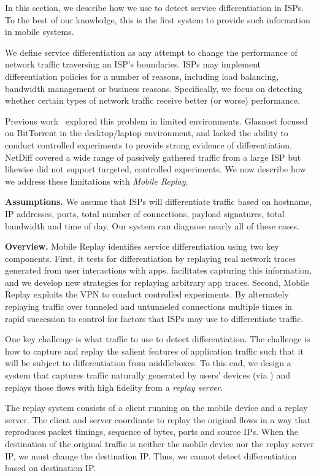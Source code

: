 In this section, we describe how we use \meddle to detect service differentiation 
in ISPs. To the best of our knowledge, this is the first system to provide such information 
in mobile systems.

We define service differentiation as any attempt to change the performance 
of network traffic traversing an ISP's boundaries. ISPs may implement differentiation policies 
for a number of reasons, including load balancing, bandwidth management or business reasons. 
Specifically, we focus on detecting whether certain types of network traffic receive 
better (or worse) performance. 

Previous work~\cite{glasnost,netdiff} explored this problem in limited 
environments. Glasnost focused on BitTorrent in the desktop/laptop environment, 
and lacked the ability to conduct controlled experiments to provide strong evidence 
of differentiation. NetDiff covered a wide range of passively gathered traffic from a 
large ISP but likewise did not support targeted, controlled experiments. We now 
describe how we address these limitations with \emph{Mobile Replay}. 

\noindent\textbf{Assumptions.} We assume that ISPs will differentiate traffic based on hostname, 
IP addresses, ports, total number of connections, payload signatures, total bandwidth and time of day. 
Our system can diagnose nearly all of these cases. 

\noindent\textbf{Overview.} Mobile Replay identifies service differentiation using 
two key components. First, it tests for differentiation by replaying real network traces 
generated from user interactions with apps. \meddle facilitates capturing this information, 
and we develop new strategies for replaying arbitrary app traces. Second, Mobile 
Replay exploits the \meddle VPN to conduct controlled experiments. By alternately replaying 
traffic over tunneled and untunneled connections multiple times in rapid succession to control 
for factors that ISPs may use to differentiate traffic.

One key challenge is what traffic to use to detect differentiation. The challenge is how to capture and replay 
the salient features of application traffic such that it will be subject to differentiation 
from middleboxes. To this end, we design a system that captures 
traffic naturally generated by users' devices (via \meddle) and replays those flows 
with high fidelity from a \emph{replay server}. 

The replay system consists of a client running on the mobile device and a replay server. 
The client and server coordinate to replay the original flows in a way that reproduces packet timings, 
sequence of bytes, ports and source IPs. When the destination of the original traffic is neither the 
mobile device nor the replay server IP, we must change the destination IP. Thus, we cannot detect 
differentiation based on destination IP. 

